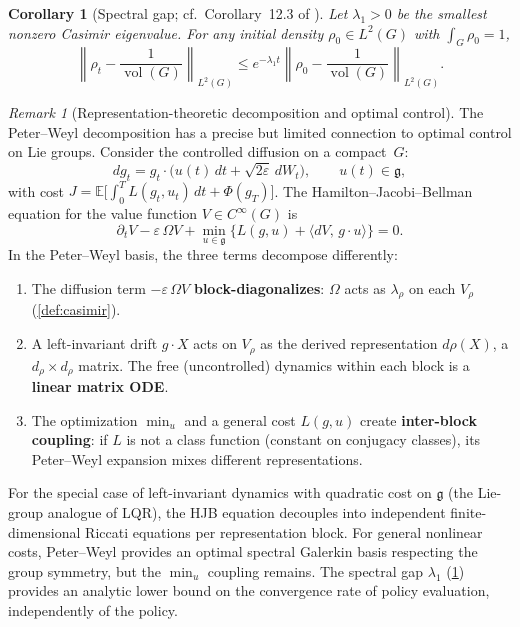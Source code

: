 \documentclass[12pt]{amsart}
\newtheorem{corollary}[theorem]{Corollary}
\theoremstyle{definition}
\theoremstyle{remark}
\newtheorem*{remark}{Remark}
\begin{document}
\begin{corollary}[Spectral gap; cf.\ Corollary~12.3 of {\cite{OCT}}]\label{cor:spectral-gap}
Let $\lambda_1 > 0$ be the smallest nonzero Casimir eigenvalue. For any initial density $\rho_0 \in L^2(G)$ with $\int_G \rho_0 = 1$,
\[
\left\| \rho_t - \frac{1}{\operatorname{vol}(G)} \right\|_{L^2(G)} \leq e^{-\lambda_1 t}\left\| \rho_0 - \frac{1}{\operatorname{vol}(G)} \right\|_{L^2(G)}.
\]
\end{corollary}

\begin{remark}[Representation-theoretic decomposition and optimal control]
The Peter--Weyl decomposition has a precise but limited connection to optimal control on Lie groups. Consider the controlled diffusion on a compact~$G$:
\[
dg_t = g_t \cdot \bigl(u(t)\, dt + \sqrt{2\varepsilon}\, dW_t\bigr), \qquad u(t) \in \mathfrak{g},
\]
with cost $J = \mathbb{E}\bigl[\int_0^T L(g_t, u_t)\, dt + \Phi(g_T)\bigr]$. The Hamilton--Jacobi--Bellman equation for the value function $V \in C^\infty(G)$ is
\[
\partial_t V - \varepsilon\, \Omega V + \min_{u \in \mathfrak{g}}\bigl\{L(g, u) + \langle dV,\, g \cdot u\rangle\bigr\} = 0.
\]
In the Peter--Weyl basis, the three terms decompose differently:
\begin{enumerate}[label=(\roman*)]
\item The diffusion term $-\varepsilon\, \Omega V$ \textbf{block-diagonalizes}: $\Omega$ acts as $\lambda_\rho$ on each $V_\rho$ (\cref{def:casimir}).
\item A left-invariant drift $g \cdot X$ acts on $V_\rho$ as the derived representation $d\rho(X)$, a $d_\rho \times d_\rho$ matrix. The free (uncontrolled) dynamics within each block is a \textbf{linear matrix ODE}.
\item The optimization $\min_u$ and a general cost $L(g, u)$ create \textbf{inter-block coupling}: if $L$ is not a class function (constant on conjugacy classes), its Peter--Weyl expansion mixes different representations.
\end{enumerate}
For the special case of left-invariant dynamics with quadratic cost on $\mathfrak{g}$ (the Lie-group analogue of LQR), the HJB equation decouples into independent finite-dimensional Riccati equations per representation block. For general nonlinear costs, Peter--Weyl provides an optimal spectral Galerkin basis respecting the group symmetry, but the $\min_u$ coupling remains. The spectral gap $\lambda_1$ (\cref{cor:spectral-gap}) provides an analytic lower bound on the convergence rate of policy evaluation, independently of the policy.
\end{remark}
\end{document}
